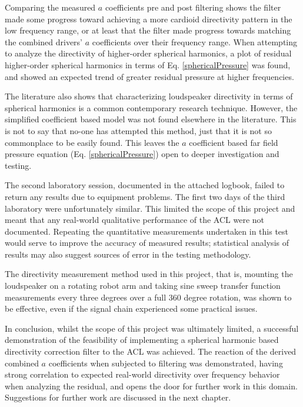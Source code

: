 \documentclass{report}
\begin{document}
    Comparing the measured $a$ coefficients pre and post filtering shows the filter made some progress toward achieving a more cardioid directivity pattern in the low frequency range, or at least that the filter made progress towards matching the combined drivers' $a$ coefficients over their frequency range.
    When attempting to analyze the directivity of higher-order spherical harmonics, a plot of residual higher-order spherical harmonics in terms of Eq. \ref{sphericalPressure} was found, and showed an expected trend of greater residual pressure at higher frequencies.

    The literature also shows that characterizing loudspeaker directivity in terms of spherical harmonics is a common contemporary research technique.
    However, the simplified coefficient based model was not found elsewhere in the literature.
    This is not to say that no-one has attempted this method, just that it is not so commonplace to be easily found.
    This leaves the $a$ coefficient based far field pressure equation (Eq. \ref{sphericalPressure}) open to deeper investigation and testing.

    The second laboratory session, documented in the attached logbook, failed to return any results due to equipment problems.
    The first two days of the third laboratory were unfortunately similar.
    This limited the scope of this project and meant that any real-world qualitative performance of the ACL were not documented.
    Repeating the quantitative measurements undertaken in this test would serve to improve the accuracy of measured results; statistical analysis of results may also suggest sources of error in the testing methodology.

    The directivity measurement method used in this project, that is, mounting the loudspeaker on a rotating robot arm and taking sine sweep transfer function measurements every three degrees over a full 360 degree rotation, was shown to be effective, even if the signal chain experienced some practical issues.
    
    In conclusion, whilst the scope of this project was ultimately limited, a successful demonstration of the feasibility of implementing a spherical harmonic based directivity correction filter to the ACL was achieved.
    The reaction of the derived combined $a$ coefficients when subjected to filtering was demonstrated, having strong correlation to expected real-world directivity over frequency behavior when analyzing the residual, and opens the door for further work in this domain.
    Suggestions for further work are discussed in the next chapter.
\end{document}
